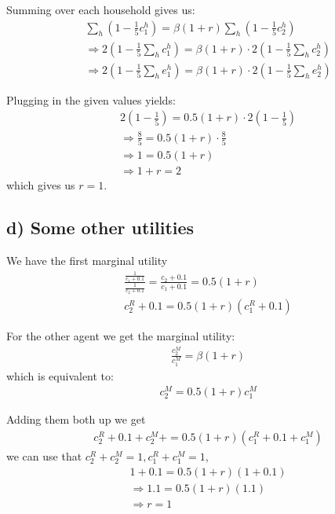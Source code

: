\documentclass[11pt,a4paper]{article}
\begin{document}
Summing over each household gives us:
\begin{align*}
&\sum_h (1-\frac{1}{5}c_1^h) = \beta(1+r) \sum_h (1-\frac{1}{5}c_2^h) \\
&\Rightarrow 2 \left(1-\frac{1}{5}\sum_h c_1^h\right) = \beta(1+r) \cdot 2 \left(1-\frac{1}{5}\sum_h c_2^h\right) \\
&\Rightarrow 2 \left(1-\frac{1}{5}\sum_h e_1^h\right) = \beta(1+r) \cdot 2 \left(1-\frac{1}{5}\sum_h e_2^h\right)
\end{align*}

Plugging in the given values yields:
\begin{align*}
&2 \left(1-\frac{1}{5}\right) = 0.5(1+r) \cdot 2 \left(1-\frac{1}{5}\right) \\
&\Rightarrow \frac{8}{5} = 0.5(1+r) \cdot \frac{8}{5} \\
&\Rightarrow 1 = 0.5(1+r) \\
&\Rightarrow 1+r = 2
\end{align*}
which gives us $r=1$.

\subsection*{d) Some other utilities}
We have the first marginal utility 
\begin{align*}
&\frac{\frac{1}{c_1 + 0.1}}{\frac{1}{c_2 + 0.1}} = \frac{c_2 + 0.1}{c_1 + 0.1}= 0.5(1+r) \\
&c_{2}^R + 0.1 = 0.5(1+r)(c_1^R + 0.1)
\end{align*}

For the other agent we get the marginal utility:
\begin{align*}
&\frac{c_2^M}{c_1^M} = \beta (1+r)
\end{align*}
which is equivalent to:
\begin{align*}
&c_{2}^M = 0.5 (1+r)c_{1}^M
\end{align*}

Adding them both up we get
\begin{align*}
&c_{2}^R + 0.1 + c_{2}^M + = 0.5(1+r)(c_1^R + 0.1 + c_1^M )
\end{align*}
we can use that $c_{2}^R + c_{2}^M = 1, c_{1}^R + c_{1}^M = 1$,
\begin{align*}
&1 + 0.1 = 0.5(1+r)(1+ 0.1) \\
&\Rightarrow 1.1 = 0.5(1+r)(1.1) \\
&\Rightarrow r = 1
\end{align*}
\end{document}
